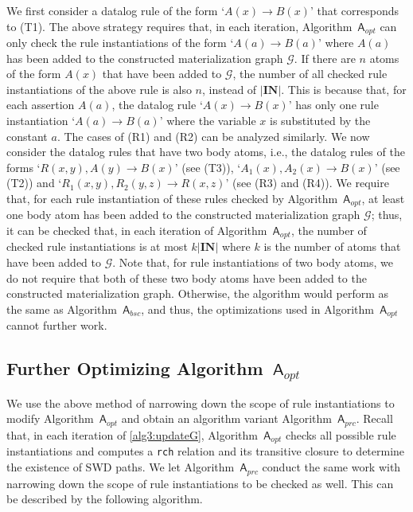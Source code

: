 We first consider a datalog rule of the
form `$A(x)\rightarrow B(x)$' that corresponds to (T1). The above strategy requires that,
in each iteration, Algorithm~$\mathsf{A}_{opt}$ can only check the rule instantiations
of the form `$A(a)\rightarrow B(a)$' where $A(a)$ has been added to the constructed materialization
graph $\mathcal{G}$. If there are $n$ atoms of the form $A(x)$ that have been added to $\mathcal{G}$,
the number of all checked rule instantiations of the above rule is also $n$, instead of $|\textbf{IN}|$.
This is because that, for each assertion $A(a)$,
the datalog rule `$A(x)\rightarrow B(x)$'
has only one rule instantiation `$A(a)\rightarrow B(a)$' where
the variable $x$ is substituted by the constant $a$.
The cases of (R1) and (R2) can be analyzed similarly.
We now consider the datalog rules that have two body atoms, i.e.,
the datalog rules of the forms `$R(x,y),A(y)\rightarrow B(x)$' (see (T3)),
`$A_1(x),A_2(x)\rightarrow B(x)$' (see (T2)) and `$R_1(x,y),R_2(y,z)\rightarrow R(x,z)$' (see (R3) and (R4)).
We require that, for each rule instantiation of these rules checked by Algorithm~$\mathsf{A}_{opt}$,
at least one body atom has been added to the constructed materialization
graph $\mathcal{G}$; thus, it can be checked that, in each iteration of Algorithm~$\mathsf{A}_{opt}$,
the number of checked rule instantiations
is at most $k|\textbf{IN}|$ where $k$ is the number of atoms that have been
added to $\mathcal{G}$.
Note that, for rule instantiations of two body atoms,
we do not require that both of these two body atoms have been added to
the constructed materialization graph.
Otherwise, the algorithm would
perform as the same as Algorithm~$\mathsf{A}_{bsc}$, and thus, the
optimizations used in Algorithm~$\mathsf{A}_{opt}$ cannot further work.



\subsection{Further Optimizing Algorithm~$\mathsf{A}_{opt}$}


We use the above method of narrowing down the scope of rule instantiations to
modify Algorithm~$\mathsf{A}_{opt}$ and obtain an algorithm variant Algorithm~$\mathsf{A}_{prc}$.
Recall that,
in each iteration of \ref{alg3:updateG}, Algorithm~$\mathsf{A}_{opt}$
checks all possible rule instantiations and computes a \texttt{rch} relation
and its transitive closure to determine the existence of SWD paths.
We let Algorithm~$\mathsf{A}_{prc}$ conduct the same work with
narrowing down the scope of rule instantiations to be checked as well. This can be described
by the following algorithm.\\

